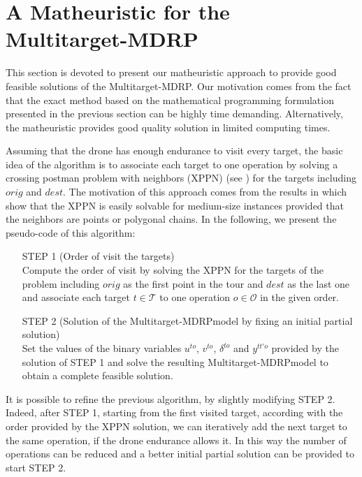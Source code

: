 \documentclass{itor}
\theoremstyle{definition}
\theoremstyle{remark}
\def\AMD{{\sf Multitarget-MDRP\xspace}}
\begin{document}
\section{A Matheuristic for the \AMD}\label{Math}
\noindent
This section is devoted to present our matheuristic approach to provide good feasible solutions of the \AMD. Our motivation comes from the fact that the exact method based on the mathematical programming formulation presented in the previous section can be highly time demanding. Alternatively, the matheuristic provides good quality solution in limited computing times.\\
\noindent

Assuming that the drone has enough endurance to visit every target, the basic idea of the algorithm is to associate each target to one operation by solving a crossing postman problem with neighbors  (XPPN) (see \cite{Puerto2021}) for the targets including $orig$ and $dest$. The motivation of this approach comes from the results in \cite{Puerto2021} which show that the XPPN is easily solvable for medium-size instances provided that the neighbors are points or polygonal chains. 
In the following, we present the pseudo-code of this algorithm:



\begin{itemize} 
\item[STEP 1] (Order of visit the targets)\\
Compute the order of visit by solving the XPPN for the targets of the problem including $orig$ as the first point in the tour and $dest$ as the last one and associate each target $t\in\mathcal T$ to one operation $o\in\mathcal O$ in the given order.
\item [STEP 2] (Solution of the \AMD\space model by fixing an initial partial solution)\\
Set the values of the binary variables $u^{to}$, $v^{to}$, $\delta^{to}$ and $y^{tt'o}$ provided by the solution of STEP 1 and solve the resulting \AMD\space model to obtain a complete feasible solution.
\end{itemize}


It is possible to refine the previous algorithm, by slightly modifying STEP 2. Indeed, after STEP 1, starting from the first visited target, according with the order provided by the XPPN solution, we can iteratively add the next target to the same operation, if the drone endurance allows it. In this way the number of operations can be reduced and a better initial partial solution can be provided to start STEP 2.
\end{document}
